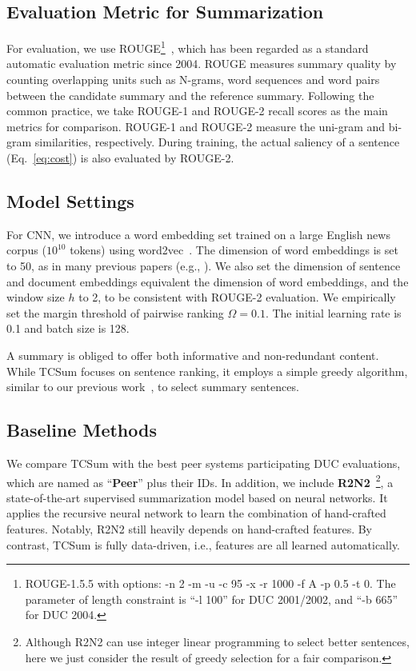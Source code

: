 \documentclass[letterpaper]{article}
\begin{document}
\subsection{Evaluation Metric for Summarization}
For evaluation, we use ROUGE\footnote{ROUGE-1.5.5 with options: -n 2 -m -u -c 95 -x -r 1000 -f A -p 0.5 -t 0. The parameter of length constraint is ``-l 100'' for DUC 2001/2002, and ``-b 665'' for DUC 2004.}~\cite{lin2004rouge}, which has been regarded as a standard automatic evaluation metric since 2004.
ROUGE measures summary quality by counting overlapping units such as N-grams, word sequences and word pairs between the candidate summary and the reference summary.
Following the common practice, we take ROUGE-1 and ROUGE-2 recall scores as the main metrics for comparison.
ROUGE-1 and ROUGE-2 measure the uni-gram and bi-gram similarities, respectively.
During training, the actual saliency of a sentence (Eq.~\ref{eq:cost}) is also evaluated by ROUGE-2.

\subsection{Model Settings}
For CNN, we introduce a word embedding set trained on a large English news corpus ($10^{10}$ tokens) using word2vec~\cite{mikolov2013efficient}.
The dimension of word embeddings is set to 50, as in many previous papers (e.g.,  \cite{Collobert2011}).
We also set the dimension of sentence and document embeddings equivalent the dimension of word embeddings, and the window size $h$ to 2, to be consistent with ROUGE-2 evaluation.
We empirically set the margin threshold of pairwise ranking $\Omega=0.1$.
The initial learning rate is 0.1 and batch size is 128.

A summary is obliged to offer both informative and non-redundant content.
While TCSum focuses on sentence ranking, it employs a simple greedy algorithm, similar to our previous work~\cite{cao2016attsum}, to select summary sentences.



\subsection{Baseline Methods} \label{SC:baseline}
We compare TCSum with the best peer systems participating DUC evaluations, which are named as ``\textbf{Peer}'' plus their IDs.
In addition, we include \textbf{R2N2}~\cite{cao2015ranking}\footnote{Although R2N2 can use integer linear programming to select better sentences, here we just consider the result of greedy selection for a fair comparison.}, a state-of-the-art supervised summarization model based on neural networks.
It applies the recursive neural network to learn the combination of hand-crafted features.
Notably, R2N2 still heavily depends on hand-crafted features.
By contrast, TCSum is fully data-driven, i.e., features are all learned automatically.
\end{document}
